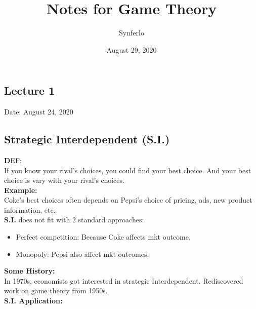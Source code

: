 \documentclass[12pt]{article}
\title{Notes for Game Theory}
\author{Synferlo}
\date{August 29, 2020}
\newcommand{\bb}[1]{{\textbf {#1}}}
\begin{document}
\begin{spacing}{1.5}
    \maketitle
    
    \newpage  
    \section{Lecture 1}
        \begin{flushright}
            Date: August 24, 2020    
        \end{flushright}
        

        \subsection{Strategic Interdependent (S.I.)}
            
            {\textbf DEF:}\\ If you know your rival's choices, you could find your best choice.
            And your best choice is vary with your rival's choices.\\

            \bb{Example:}\\ Coke's best choices often depends on Pepsi's choice of pricing,
            ads, new product information, etc.\\

            \bb{S.I.} does not fit with 2 standard approaches:

            \begin{itemize}
                \item Perfect competition: Because Coke affects mkt outcome.
                \item Monopoly: Pepsi also affect mkt outcomes.
            \end{itemize}

            \bb{Some History:}\\ In 1970s, economists got interested in strategic Interdependent.
            Rediscovered work on game theory from 1950s.\\

            \bb{S.I. Application:}


\end{spacing}
\end{document}
